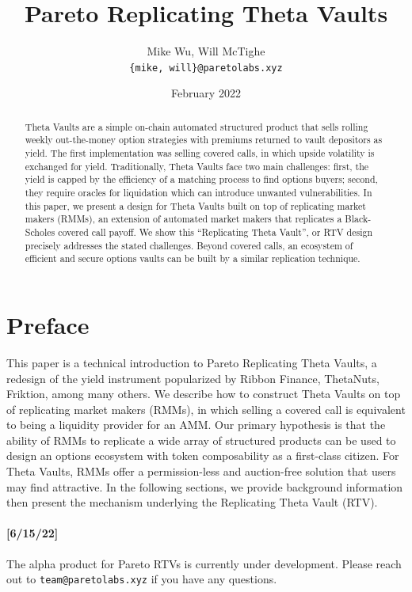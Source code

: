 \documentclass[hidelinks, 12pt]{article}
\title{Pareto Replicating Theta Vaults}
\author{Mike Wu, Will McTighe \\ \small\texttt{\{mike, will\}@paretolabs.xyz}}
\date{February 2022}
\begin{document}
\maketitle

\tableofcontents

\begin{abstract}
Theta Vaults are a simple on-chain automated structured product that sells rolling weekly out-the-money option strategies with premiums returned to vault depositors as yield. The first implementation was selling covered calls, in which upside volatility is exchanged for yield.
Traditionally, Theta Vaults face two main challenges: first, the yield is capped by the efficiency of a matching process to find options buyers; second, they require oracles for liquidation which can introduce unwanted vulnerabilities.
In this paper, we present a design for Theta Vaults built on top of replicating market makers (RMMs), an extension of automated market makers that replicates a Black-Scholes covered call payoff.
We show this ``Replicating Theta Vault'', or RTV design precisely addresses the stated challenges.
Beyond covered calls, an ecosystem of efficient and secure options vaults can be built by a similar replication technique.
\end{abstract}

\section{Preface}

This paper is a technical introduction to Pareto Replicating Theta Vaults, a redesign of the yield instrument popularized by Ribbon Finance, ThetaNuts, Friktion, among many others. We describe how to construct Theta Vaults on top of replicating market makers (RMMs), in which selling a covered call is equivalent to being a liquidity provider for an AMM. Our primary hypothesis is that the ability of RMMs to replicate a wide array of structured products can be used to design an options ecosystem with token composability as a first-class citizen. For Theta Vaults, RMMs offer a permission-less and auction-free solution that users may find attractive. In the following sections, we provide background information then present the mechanism underlying the Replicating Theta Vault (RTV).

\paragraph{[6/15/22]} The alpha product for Pareto RTVs is currently under development. Please reach out to \texttt{team@paretolabs.xyz} if you have any questions.
\end{document}
